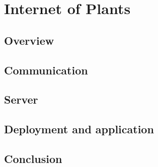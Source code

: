 \section{Internet of Plants}

\subsection{Overview}

\subsection{Communication}

\subsection{Server}

\subsection{Deployment and application}

\subsection{Conclusion}

